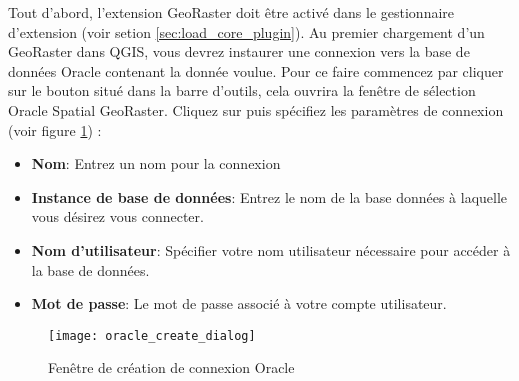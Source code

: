 Tout d'abord, l'extension GeoRaster doit être activé dans le gestionnaire d'extension (voir setion \ref{sec:load_core_plugin}). Au premier chargement d'un GeoRaster dans QGIS, vous devrez instaurer une connexion vers la base de données Oracle contenant la donnée voulue. Pour ce faire commencez par cliquer sur le bouton  situé dans la barre d'outils, cela ouvrira la fenêtre de sélection Oracle Spatial GeoRaster. Cliquez sur  puis spécifiez les paramètres de connexion (voir figure \ref{fig:oracle_create}) :


\begin{itemize}
\item \textbf{Nom}: Entrez un nom pour la connexion
\item \textbf{Instance de base de données}: Entrez le nom de la base données à laquelle vous désirez vous connecter.
\item \textbf{Nom d'utilisateur}: Spécifier votre nom utilisateur nécessaire pour accéder à la base de données.
\item \textbf{Mot de passe}: Le mot de passe associé à votre compte utilisateur.
\end{itemize}


\begin{figure}[ht]
   \begin{center}
   \caption{Fenêtre de création de connexion Oracle \nixcaption}\label{fig:oracle_create}\smallskip
   \texttt{[image: oracle\_create\_dialog]}
\end{center}
\end{figure}


